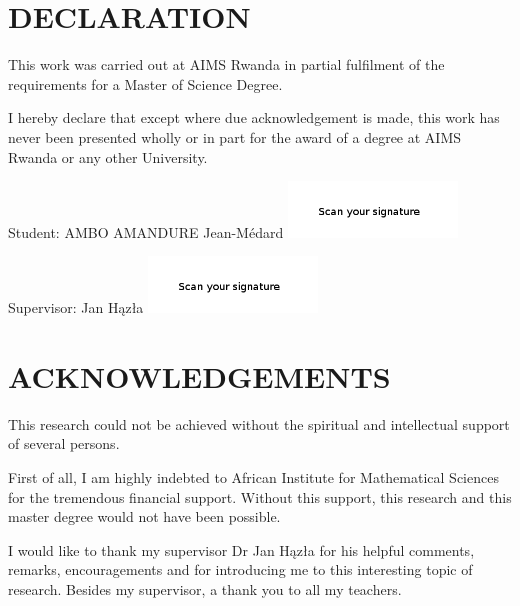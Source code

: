 \chapter*{DECLARATION}
This work was carried out at AIMS Rwanda in partial fulfilment of the requirements for a Master of Science Degree.

I hereby declare that except where due acknowledgement is made, this work has never been presented wholly or in part for the award of a degree at AIMS Rwanda or any other University.

\vspace{1.5cm}
Student: AMBO AMANDURE Jean-Médard  \includegraphics[height=1.5cm]{images/signature.png}

\vspace{1.5cm}

Supervisor: Jan Hązła \includegraphics[height=1.5cm]{images/signature1.png}


\newpage

\chapter*{ACKNOWLEDGEMENTS}


This research could not be achieved without the spiritual and intellectual support of several persons.

First of all, I am highly indebted to African Institute for Mathematical Sciences for  the tremendous  financial support. Without this support,  this research and this master degree would not have been possible.

I would like to thank my supervisor Dr Jan H{\k{a}}z{\l}a for his helpful comments, remarks, encouragements and for introducing me to this interesting topic of research. Besides my supervisor, a thank you to all my teachers.

